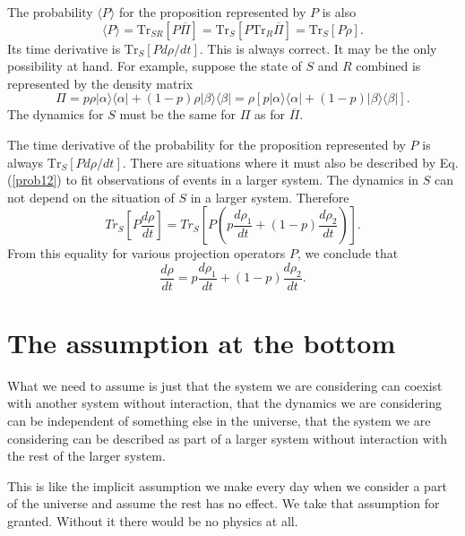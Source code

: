 \documentclass[pra, 12pt, showkeys, eqsecnum]{revtex4}
\newcommand {\Tr} {{\mbox{Tr}}}
\begin{document}
The probability $\langle P\rangle$ for the proposition represented by $P$ is also
\begin{equation}
\label{eq:ld6}
\langle P\rangle =\Tr_{SR}[P\overline{\Pi}] = \Tr_S[P\Tr_R\overline{\Pi}] = \Tr_S[P\rho ].
\end{equation}
Its time derivative is $\Tr_S[Pd\rho /dt]$. This is always correct. It may be the only possibility at hand. For example, suppose the state of $S$ and $R$ combined is represented by the density matrix
\begin{equation}
\label{eq:ld7}
\Pi = p\rho |\alpha \rangle \langle \alpha | + (1-p)\rho |\beta \rangle \langle \beta | = \rho [p|\alpha \rangle \langle \alpha | + (1-p)|\beta \rangle \langle \beta |].
\end{equation}
The dynamics for $S$ must be the same for $\Pi$ as for $\overline{\Pi}$.

The time derivative of the probability for the proposition represented by $P$ is always $\Tr_S[Pd\rho /dt]$. There are situations where it must also be described by Eq.(\ref{prob12}) to fit observations of events in a larger system. The dynamics in $S$ can not depend on the situation of $S$ in a larger system. Therefore
\begin{equation} Tr_S[P\frac{d\rho} {dt}] = Tr_S[P(p\frac{d\rho_{1}} {dt} + (1-p)\frac{d\rho_{2}} {dt})]. 
\end{equation}
From this equality for various projection operators $P$, we conclude that
\begin{equation}
\label{eq:ld3}
\frac{d\rho} {dt} = p\frac{d\rho_{1}} {dt} + (1-p)\frac{d\rho_{2}} {dt}.
\end{equation}

\section{The assumption at the bottom}\label{eight}

What we need to assume is just that the system we are considering can coexist with another system without interaction, that the dynamics we are considering can be independent of something else in the universe, that the system we are considering can be described as part of a larger system without interaction with the rest of the larger system.

This is like the implicit assumption we make every day when we consider a part of the universe and assume the rest has no effect. We take that assumption for granted. Without it there would be no physics at all.
\end{document}
